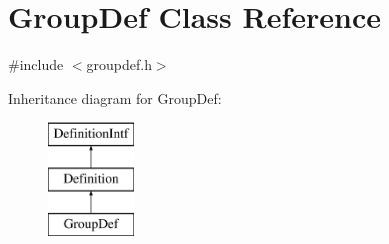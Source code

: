 \hypertarget{class_group_def}{}\section{Group\+Def Class Reference}
\label{class_group_def}


{\ttfamily \#include $<$groupdef.\+h$>$}

Inheritance diagram for Group\+Def\+:\begin{figure}[H]
\begin{center}
\leavevmode
\includegraphics[height=3.000000cm]{class_group_def}
\end{center}
\end{figure}
